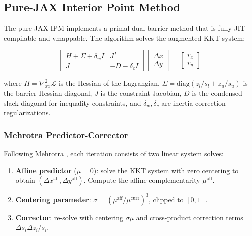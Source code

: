 \documentclass[12pt,preprint]{article}
\begin{document}
\subsection{Pure-JAX Interior Point Method}
\label{sec-jax-ipm}

The pure-JAX IPM implements a primal-dual barrier method that is fully JIT-compilable and vmappable. The algorithm solves the augmented KKT system:


\begin{equation}
\begin{bmatrix}
H + \Sigma + \delta_w I & J^T \\
J & -D - \delta_c I
\end{bmatrix}
\begin{bmatrix}
\Delta x \\
\Delta y
\end{bmatrix}
=
\begin{bmatrix}
r_x \\
r_y
\end{bmatrix}
\end{equation}


where $H = \nabla^2_{xx} \mathcal{L}$ is the Hessian of the Lagrangian, $\Sigma = \mathrm{diag}(z_l / s_l + z_u / s_u)$ is the barrier Hessian diagonal, $J$ is the constraint Jacobian, $D$ is the condensed slack diagonal for inequality constraints, and $\delta_w, \delta_c$ are inertia correction regularizations.

\subsubsection{Mehrotra Predictor-Corrector}
\label{org-mehrotra-predictor-corrector}
Following Mehrotra \cite{Mehrotra1992}, each iteration consists of two linear system solves:


\begin{enumerate}
\item \textbf{Affine predictor} ($\mu = 0$): solve the KKT system with zero centering to obtain $(\Delta x^{\mathrm{aff}}, \Delta y^{\mathrm{aff}})$. Compute the affine complementarity $\mu^{\mathrm{aff}}$.

\item \textbf{Centering parameter}: $\sigma = (\mu^{\mathrm{aff}} / \mu^{\mathrm{curr}})^3$, clipped to $[0, 1]$.

\item \textbf{Corrector}: re-solve with centering $\sigma\mu$ and cross-product correction terms $\Delta s_i \Delta z_i / s_i$.

\end{enumerate}
\end{document}
